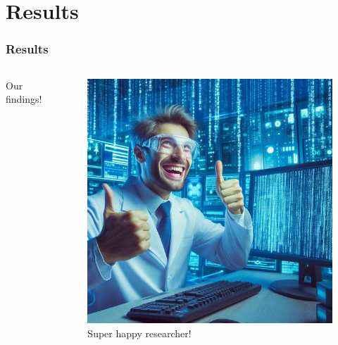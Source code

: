 \documentclass{beamer}
\begin{document}
\section{Results}

\begin{frame}
  \frametitle{Results}
  \begin{columns}
    \begin{column}{0.5\textwidth}
      Our findings!
    \end{column}
    \begin{column}{0.5\textwidth}
      \begin{figure}
        \caption{Super happy researcher!\footnotemark[1]}
        \includegraphics[width=.8\textwidth]{images/results.jpeg}\footnotemark[1]
      \end{figure}
    \end{column}
  \end{columns}
\end{frame}
\end{document}
